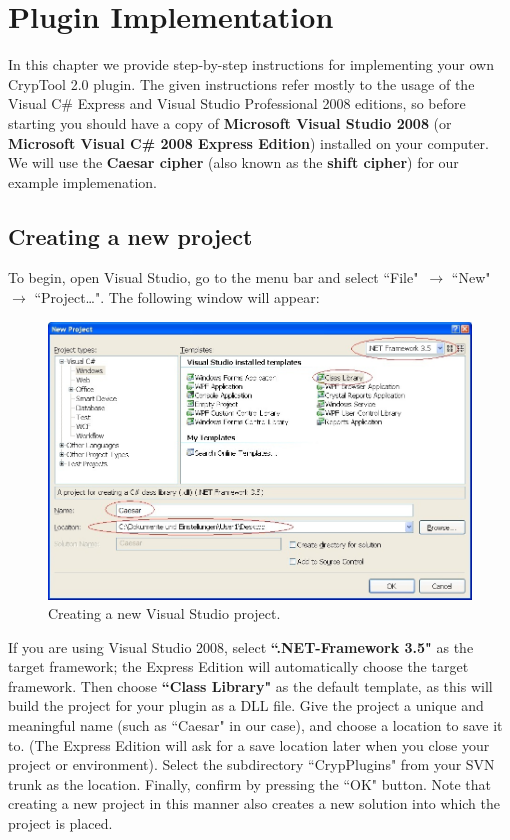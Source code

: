 \chapter{Plugin Implementation}
\label{sec:PluginImplementation}
In this chapter we provide step-by-step instructions for implementing your own CrypTool 2.0 plugin. The given instructions refer mostly to the usage of the Visual C\# Express and Visual Studio Professional 2008 editions, so before starting you should have a copy of \textbf{Microsoft Visual Studio 2008} (or \textbf{Microsoft Visual C\# 2008 Express Edition}) installed on your computer. We will use the \textbf{Caesar cipher} (also known as the \textbf{shift cipher}) for our example implemenation.

\section{Creating a new project}
\label{sec:CreatingANewProject}

To begin, open Visual Studio, go to the menu bar and select ``File"~$\rightarrow$ ``New" $\rightarrow$ ``Project\ldots ". The following window will appear:

\begin{figure}[h!]
	\centering
		\includegraphics[width=1.00\textwidth]{figures/vs_create_new_project.jpg}
	\caption{Creating a new Visual Studio project.}
	\label{fig:vs_create_new_project}
\end{figure}

\noindent If you are using Visual Studio 2008, select \textbf{``.NET-Framework 3.5"} as the target framework; the Express Edition will automatically choose the target framework. Then choose \textbf{``Class Library"} as the default template, as this will build the project for your plugin as a DLL file. Give the project a unique and meaningful name (such as ``Caesar" in our case), and choose a location to save it to. (The Express Edition will ask for a save location later when you close your project or environment). Select the subdirectory ``CrypPlugins" from your SVN trunk as the location. Finally, confirm by pressing the ``OK" button. Note that creating a new project in this manner also creates a new solution into which the project is placed.

